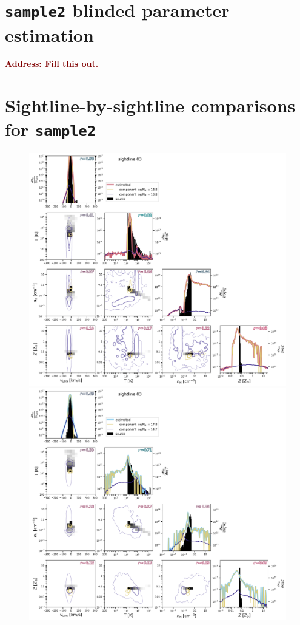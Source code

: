 \documentclass[fleqn,usenatbib]{mnras}
\newcommand{\todo}[1]{\textcolor{Maroon}{\textbf{Address: #1}}}
\begin{document}

\appendix

\section{\texttt{sample2} blinded parameter estimation}
\label{a: sample2 blinded}

\todo{Fill this out.}

\section{Sightline-by-sightline comparisons for \texttt{sample2}}
\label{a: all sightlines for sample2}

\begin{figure}
    \centering
    \includegraphics[height=0.45\textheight]{figures/sample2/original/sightline_0003.png}
    \includegraphics[height=0.45\textheight]{figures/sample2/high-z/sightline_0003.png}

\end{figure}
\end{document}
